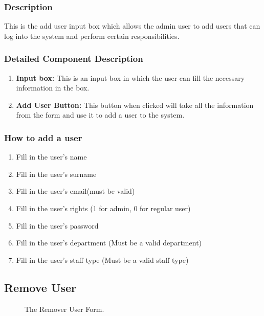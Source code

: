 \documentclass[14pt, a4paper]{article}
\begin{document}
	\subsubsection{Description} This is the add user input box which allows the admin user to add users that can log into the system and perform certain responsibilities.
	\subsubsection{Detailed Component Description}
		\begin{enumerate}
			\item \textbf{Input box:} This is an input box in which the user can fill the necessary information in the box.
			\item \textbf{Add User Button:} This button when clicked will take all the information from the form and use it to add a user to the system.
		\end{enumerate}
	\subsubsection{How to add a user}
		\begin{enumerate}
			\item Fill in the user's name
			\item Fill in the user's surname
			\item Fill in the user's email(must be valid)
			\item Fill in the user's rights (1 for admin, 0 for regular user)
			\item Fill in the user's password
			\item Fill in the user's department (Must be a valid department)
			\item Fill in the user's staff type (Must be a valid staff type)
		\end{enumerate}
\subsection{Remove User}
	\begin{figure}[H]
		\centerline{}
		\caption{The Remover User Form.}
		\label{fig:removeUser1}
	\end{figure}
\end{document}
